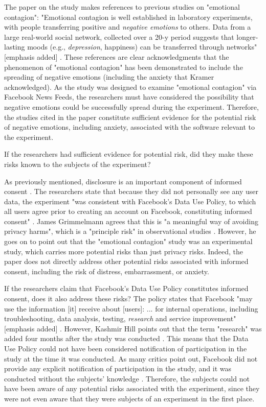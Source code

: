 The paper on the study makes references to previous studies on "emotional contagion": "Emotional contagion is well established in laboratory experiments, with people transferring positive and \textit{negative emotions} to others.  Data from a large real-world social network, collected over a 20-y period suggests that longer-lasting moods (e.g., \textit{depression}, happiness) can be transferred through networks" [emphasis added] \cite{study}.  These references are clear acknowledgments that the phenomenon of "emotional contagion" has been demonstrated to include the spreading of negative emotions (including the anxiety that Kramer acknowledged).  As the study was designed to examine "emotional contagion" via Facebook News Feeds, the researchers must have considered the possibility that negative emotions could be successfully spread during the experiment.  Therefore, the studies cited in the paper constitute sufficient evidence for the potential risk of negative emotions, including anxiety, associated with the software relevant to the experiment. \par

If the researchers had sufficient evidence for potential risk, did they make these risks known to the subjects of the experiment? \par
As previously mentioned, disclosure is an important component of informed consent \cite{irb-informed-consent}.  The researchers state that because they did not personally see any user data, the experiment "was consistent with Facebook’s Data Use Policy, to which all users agree prior to creating an account on Facebook, constituting informed consent" \cite{study}.  James Grimmelmann agrees that this is "a meaningful way of avoiding privacy harms", which is a "principle risk" in observational studies \cite{laboratorium}.  However, he goes on to point out that the "emotional contagion" study was an experimental study, which carries more potential risks than just privacy risks.  Indeed, the paper does not directly address other potential risks associated with informed consent, including the risk of distress, embarrassment, or anxiety. \par
If the researchers claim that Facebook's Data Use Policy constitutes informed consent, does it also address these risks?  The policy states that Facebook "may use the information [it] receive about [users]: ... for internal operations, including troubleshooting, data analysis, testing, \textit{research} and service improvement" [emphasis added] \cite{leeper}.  However, Kashmir Hill points out that the term "research" was added four months after the study was conducted \cite{forbes}.  This means that the Data Use Policy could not have been considered notification of participation in the study at the time it was conducted.  As many critics point out, Facebook did not provide any explicit notification of participation in the study, and it was conducted without the subjects' knowledge \cite{atlantic} \cite{forbes} \cite{leeper} \cite{slate}.  Therefore, the subjects could not have been aware of any potential risks associated with the experiment, since they were not even aware that they were subjects of an experiment in the first place.

